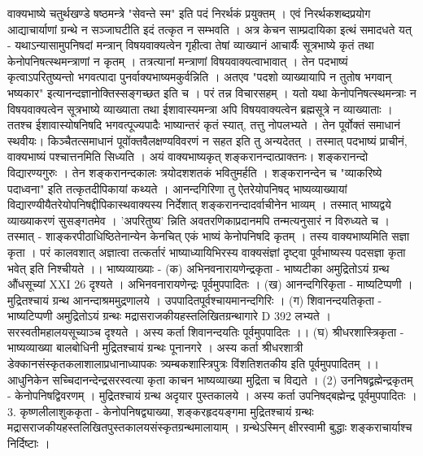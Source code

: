 वाक्यभाष्ये चतुर्थखण्डे षष्ठमन्त्रे "सेवन्ते स्म" इति पदं निरर्थकं प्रयुक्तम् । एवं निरर्थकशब्दप्रयोग आद्याचार्याणां ग्रन्थे न सञ्जाघटीति इदं तत्कृत न सम्भवति । 
अत्र केचन साम्प्रदायिका इत्थं समादधते यत् - यथाऽन्यासामुपनिषदां मन्त्रान् विषयवाक्यत्वेन गृहीत्वा तेषां व्याख्यानं आचार्यैः सूत्रभाष्ये कृतं तथा केनोपनिषत्स्थमन्त्राणां न कृतम् । तत्रत्यानां मन्त्राणां विषयवाक्यत्वाभावात् । तेन पदभाष्यं कृत्वाऽपरितुष्यन्तो भगवत्पादा पुनर्वाक्यभाष्यमकुर्वन्निति । अतएव "पदशो व्याख्यायापि न तुतोष भगवान् भष्यकार" इत्यानन्दज्ञानोक्तिस्सङ्गच्छत इति च । परं तन्न विचारसहम् । यतो यथा केनोपनिषत्स्थमन्त्राः न विषयवाक्यत्वेन सूत्रभाष्ये व्याख्याता तथा ईशावास्यमन्त्रा अपि विषयवाक्यत्वेन ब्रह्मसूत्रे न व्याख्याताः । ततश्च ईशावास्योषनिषदि भगवत्पूज्यपादैः भाष्यान्तरं कृतं स्यात्, तत्तु नोपलभ्यते । तेन पूर्वोक्तं समाधानं स्थवीयः। किञ्चैतत्समाधानं पूवोंक्तवैलक्षण्यविवरणं न सहत इति तु अन्यदेतत् । तस्मात् पदभाष्यं प्राचीनं, वाक्यभाष्यं पश्चात्तनमिति सिध्यति । 
अयं वाक्यभाष्यकृत् शङ्करानन्दात्प्राक्तनः। शङ्करानन्दो विद्यारण्यगुरुः । तेन शङ्करानन्दकालः त्रयोदशशतकं भवितुमर्हति । शङ्करानन्देन च "व्याकरिष्ये पदाध्वना" इति तत्कृतदीपिकायां कथ्यते । आनन्दगिरिणा तु ऐतरेयोपनिषद् भाष्यव्याख्यायां विद्यारण्यीयैतरेयोपनिषद्दीपिकास्थवाक्यस्य निर्देशात् शङ्करानन्दादर्वाचीनेन भाव्यम् । तस्मात् भाष्यद्वये व्याख्याकरणं सुसङ्गतमेव । 'अपरितुष्य' न्निति अवतरणिकाप्रदानमपि तन्मत्यनुसारं न विरुध्यते च । 
तस्मात् - शाङ्करपीठाधिष्ठितेनान्येन केनचित् एकं भाष्यं केनोपनिषदि कृतम् । तस्य वाक्यभाष्यमिति सज्ञा कृता । परं कालवशात् अज्ञात्वा तत्कर्तारं भाष्याध्यायिभिरस्य वाक्यसंज्ञां दृष्ट्वा पूर्वभाष्यस्य पदसज्ञा कृता भवेत्  इति निश्चीयते ।।
भाष्यव्याख्याः - 
(क) अभिनवनारायणेन्द्रकृता - भाष्यटीका 
अमुद्रितोऽयं ग्रन्थ औंधसूच्यां XXI 26 दृश्यते । अभिनवनारायणेन्द्रः पूर्वमुपपादितः । 
(ख) आनन्दगिरिकृता - माष्यटिप्पणी । मुद्रितश्चायं ग्रन्थ आनन्दाश्रममुद्रणालये । उपपादितपूर्वश्चायमानन्दगिरिः ।
(ग) शिवानन्दयतिकृता - भाष्यटिप्पणी 
अमुद्रितोऽयं ग्रन्थः मद्रासराजकीयहस्तलिखितग्रन्थागारे D 392 लभ्यते । सरस्वतीमहालयसूच्याञ्च दृश्यते । अस्य कर्ता शिवानन्दयतिः पूर्वमुपपादितः ।। 
(घ) श्रीधरशास्त्रिकृता - भाष्यव्याख्या बालबोधिनी 
मुद्रितश्चायं ग्रन्थः पूनानगरे । अस्य कर्ता श्रीधरशात्री डेक्कानसंस्कृतकलाशालाप्रधानाध्यापकः त्र्यम्बकशास्त्रिपुत्रः विंशतिशतकीय इति पूर्वमुपपादितम् ।। आधुनिकेन सच्चिदानन्देन्द्रसरस्वत्या कृता काचन भाष्यव्याख्या मुद्रिता च विद्यते ।
(2) उननिषद्व्रह्मेन्द्रकृतम् - केनोपनिषद्विवरणम् । मुद्रितश्चायं ग्रन्थ अदृयार पुस्तकालये । अस्य कर्ता उपनिषद्बह्मेन्द्र पूर्वमुपपादितः ।
3.  कृष्णलीलाशुककृता - केनोपनिषद्व्याख्या, शङ्करहृदयङ्गमा मुद्रितश्चायं ग्रन्थः मद्रासराजकीयहस्तलिखितपुस्तकालयसंस्कृतग्रन्थमालायाम् । ग्रन्थेऽस्मिन् क्षीरस्वामी बुद्धाः शङ्कराचार्याश्च निर्दिष्टाः । 

